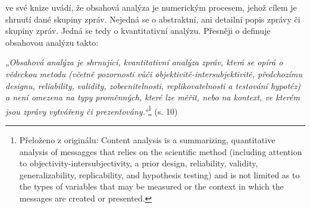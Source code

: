     \cite{Neuendorf} ve své knize uvádí, že obsahová analýza je numerickým procesem, jehož cílem je shrnutí dané skupiny zpráv. Nejedná se o abstraktní, ani detailní popis zprávy či skupiny zpráv. Jedná se tedy o kvantitativní analýzu. Přesněji o definuje obsahovou analýzu takto: 
    \setlength\parskip{5mm}
    
    \textit{
    „Obsahová analýza je shrnující, kvantitativní analýza zpráv, která se opírá o vědeckou metodu (včetně pozornosti vůči objektivitě-intersubjektivitě, předchozímu designu, reliability, validity, zobecnitelnosti, replikovatelnosti a testování hypotéz) a není omezena na typy proměnných, které lze měřit, nebo na kontext, ve kterém jsou zprávy vytvářeny či prezentovány.“}\footnote{Přeloženo z originálu: Content analysis is a summarizing, quantitative analysis of messagges that relies on the scientific method (including attention to objectivity-intersubjectivity, a prior design, reliability, validity, generalizability, replicability, and hypothesis testing) and is not limited as to the types of variables that may be measured or the context in which the messages are created or presented.} (s. 10)
    
    \setlength\parskip{0mm}

